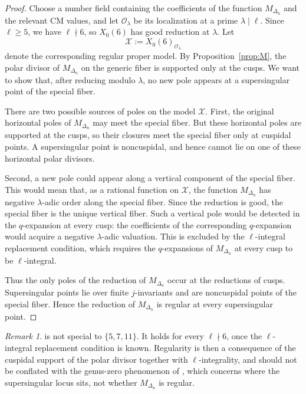 \documentclass[12pt]{amsart}
\theoremstyle{definition}
\theoremstyle{remark}
\newtheorem{remark}{Remark}
\begin{document}
\begin{proof}
Choose a number field containing the coefficients of the function
$M_{\Delta_n}$ and the relevant CM values, and let $\mathcal{O}_\lambda$
be its localization at a prime $\lambda\mid \ell$.  Since $\ell\geq 5$,
we have $\ell\nmid 6$, so $X_0(6)$ has good reduction at $\lambda$.
Let
\[
        \mathcal{X}:=X_0(6)_{\mathcal{O}_\lambda}
\]
denote the corresponding regular proper model.
By Proposition~\ref{prop:M}, the polar divisor of
$M_{\Delta_n}$ on the generic fiber is supported only at the cusps.  We
want to show that, after reducing modulo $\lambda$, no new pole appears
at a supersingular point of the special fiber.

There are two possible sources of poles on the model $\mathcal{X}$.
First, the original horizontal poles of $M_{\Delta_n}$ may meet the
special fiber.  But these horizontal poles are supported at the cusps,
so their closures meet the special fiber only at cuspidal points.  A
supersingular point is noncuspidal, and hence cannot lie on one of these
horizontal polar divisors.

Second, a new pole could appear along a vertical component of the special
fiber.  This would mean that, as a rational function on $\mathcal{X}$,
the function $M_{\Delta_n}$ has negative $\lambda$-adic order along the
special fiber.  Since the reduction is good, the special fiber is the
unique vertical fiber.  Such a vertical pole would be detected in the
$q$-expansion at every cusp: the coefficients of the corresponding
$q$-expansion would acquire a negative $\lambda$-adic valuation.  This is
excluded by the $\ell$-integral replacement condition, which requires the
$q$-expansions of $M_{\Delta_n}$ at every cusp to be $\ell$-integral.

Thus the only poles of the reduction of $M_{\Delta_n}$ occur at the
reductions of cusps.  Supersingular points lie over finite
$j$-invariants and are noncuspidal points of the special fiber.  Hence
the reduction of $M_{\Delta_n}$ is regular at every supersingular point.
\end{proof}



\begin{remark}
 is not special to $\{5,7,11\}$. It holds for every 
$\ell\nmid6$, once the $\ell$-integral replacement condition is known. Regularity is then a
consequence of the cuspidal support of the polar divisor together with $\ell$-integrality,
and should not be conflated with the genus-zero phenomenon of
, which concerns where the supersingular locus sits, not whether
$M_{\Delta_n}$ is regular.
\end{remark}
\end{document}
